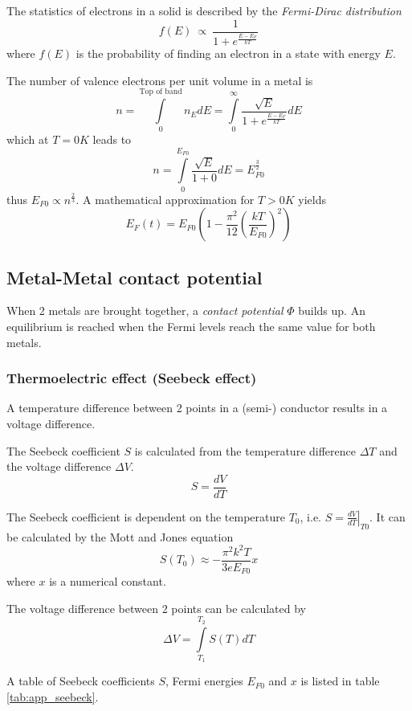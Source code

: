The statistics of electrons in a solid is described by the \emph{Fermi-Dirac distribution}
\begin{equation}
    f(E) \:\propto\: \frac{1}{1 + e^{\frac{E-E_F}{kT}}}
\end{equation}
where $f(E)$ is the probability of finding an electron in a state with energy $E$.


The number of valence electrons per unit volume in a metal is
\begin{equation}
    n = \int\limits_{0}^{\text{Top of band}} n_E dE = \int\limits_{0}^{\infty} \frac{\sqrt{E}}{1 + e^{\frac{E-E_F}{kT}}} dE
\end{equation}
which at $T=0K$ leads to
\begin{equation}
    n = \int\limits_{0}^{E_{F0}} \frac{\sqrt{E}}{1+0} dE = E_{F0}^{\frac{3}{2}}
\end{equation}
thus $E_{F0} \propto n^{\frac{2}{3}}$.
A mathematical approximation for $T > 0K$ yields
\begin{equation}
    E_F(t) = E_{F0} \left( 1 - \frac{\pi^2}{12} \left( \frac{kT}{E_{F0}} \right)^2 \right)
\end{equation}

\subsection{Metal-Metal contact potential}
When 2 metals are brought together, a \emph{contact potential} $\Phi$ builds up.
An equilibrium is reached when the Fermi levels reach the same value for both metals.

\subsubsection{Thermoelectric effect (Seebeck effect)}
A temperature difference between 2 points in a (semi-) conductor results in a voltage difference.

The Seebeck coefficient $S$ is calculated from the temperature difference $\Delta T$ and the voltage difference $\Delta V$.
\begin{equation}
    S = \frac{dV}{dT}
\end{equation}

The Seebeck coefficient is dependent on the temperature $T_0$, i.e. $S = \left.\frac{dV}{dT}\right|_{T0}$.
It can be calculated by the Mott and Jones equation
\begin{equation}
    S(T_0) \approx -\frac{\pi^2 k^2 T}{3 e E_{F0}} x
\end{equation}
where $x$ is a numerical constant.

The voltage difference between 2 points can be calculated by
\begin{equation}
    \Delta V = \int\limits_{T_1}^{T_2} S(T) dT
\end{equation}

A table of Seebeck coefficients $S$, Fermi energies $E_{F0}$ and $x$ is listed in table \ref{tab:app_seebeck}.


